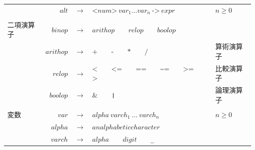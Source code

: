 \documentclass{jbook}
\begin{document}
\begin{center}
\begin{tabular} {|l r c l l|}
		                     & $alt$     & $\rightarrow$ & $\texttt{<} num \texttt{>} ~ var_1 \ldots var_n ~ \texttt{->} ~ expr$                                                                                            & $n \geq 0$              \\
		                     &           &               &                                                                                                                                                                  &                         \\
		二項演算子           & $binop$   & $\rightarrow$ & $arithop$ ~ \textbar ~ $relop$ ~ \textbar ~ $boolop$                                                                                                             &                         \\
		                     & $arithop$ & $\rightarrow$ & $\texttt{+}$ ~ \textbar ~ $\texttt{-}$ ~ \textbar ~ $\texttt{*}$ ~ \textbar ~ $\texttt{/}$                                                                       & 算術演算子              \\
		                     & $relop$   & $\rightarrow$ & $\texttt{<}$ ~ \textbar ~ $\texttt{<=}$ ~ \textbar ~ $\texttt{==}$ ~ \textbar ~	$\texttt{\textasciitilde =}$ ~ \textbar ~ $\texttt{>=}$ ~ \textbar ~ $\texttt{>}$ & 比較演算子              \\
		                     & $boolop$  & $\rightarrow$ & $\texttt{\&}$ ~ \textbar ~ $\texttt{\textbar}$                                                                                                                   & 論理演算子              \\
		                     &           &               &                                                                                                                                                                  &                         \\
		変数                 & $var$     & $\rightarrow$ & $alpha ~ varch_1 ~ \ldots ~ varch_n$                                                                                                                             & $n \geq 0$              \\
		                     & $alpha$   & $\rightarrow$ & $an alphabetic character$                                                                                                                                        &                         \\
		                     & $varch$   & $\rightarrow$ & $alpha$ ~ \textbar ~ $digit$ ~ \textbar ~ \texttt{\_}                                                                                                            &                         \\

\end{tabular}
\end{center}
\end{document}
